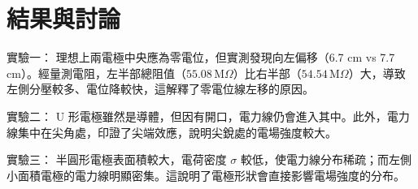 \section{\textbf{結果與討論}}
實驗一： 理想上兩電極中央應為零電位，但實測發現向左偏移（6.7 cm vs 7.7 cm）。經量測電阻，左半部總阻值（$55.08\,\text{M}\Omega$）比右半部（$54.54\,\text{M}\Omega$）大，導致左側分壓較多、電位降較快，這解釋了零電位線左移的原因。

實驗二： U 形電極雖然是導體，但因有開口，電力線仍會進入其中。此外，電力線集中在尖角處，印證了尖端效應，說明尖銳處的電場強度較大。

實驗三： 半圓形電極表面積較大，電荷密度 $\sigma$ 較低，使電力線分布稀疏；而左側小面積電極的電力線明顯密集。這說明了電極形狀會直接影響電場強度的分布。